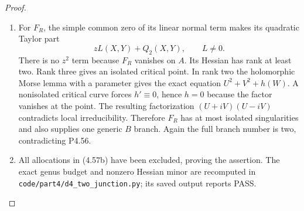 \begin{proof}
\begin{enumerate}[label={$\langle1\rangle$\arabic*.},leftmargin=*]
\item For $F_R$, the simple common zero of its linear normal
term makes its quadratic Taylor part
\[
                       zL(X,Y)+Q_2(X,Y),\qquad L\ne0.
\]
There is no $z^2$ term because $F_R$ vanishes on $A$.
Its Hessian has rank at least two. Rank three gives an
isolated critical point. In rank two the holomorphic
Morse lemma with a parameter gives the exact equation
$U^2+V^2+h(W)$. A nonisolated critical curve forces
$h'\equiv0$, hence $h=0$ because the factor vanishes
at the point. The resulting factorization
$(U+iV)(U-iV)$ contradicts local irreducibility.
Therefore $F_R$ has at most isolated singularities and
also supplies one generic $B$ branch. Again the full
branch number is two, contradicting P4.56.

\item All allocations in (4.57b) have been excluded, proving
the assertion. The exact genus budget and nonzero
Hessian minor are recomputed in
\texttt{code/part4/d4\_two\_junction.py}; its saved
output reports PASS.

\end{enumerate}
\end{proof}
